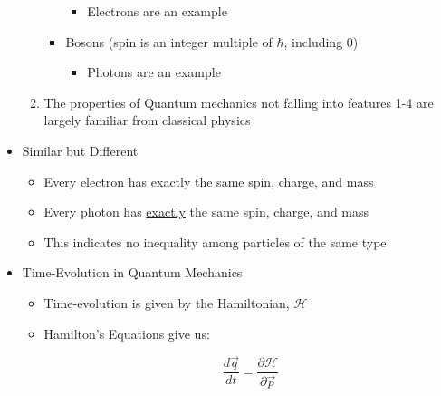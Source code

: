 \begin{itemize}
\begin{enumerate}
\begin{itemize}
            \begin{itemize}
                
              \item Electrons are an example

            \end{itemize}

          \item Bosons (spin is an integer multiple of $\hbar$, including 0)

            \begin{itemize}

              \item Photons are an example

            \end{itemize}

        \end{itemize}

      \item The properties of Quantum mechanics not falling into features 1-4 are largely familiar from classical physics

    \end{enumerate}

  \item Similar but Different

    \begin{itemize}

      \item Every electron has \underline{exactly} the same spin, charge, and mass

      \item Every photon has \underline{exactly} the same spin, charge, and mass

      \item This indicates no inequality among particles of the same type

    \end{itemize}

  \item Time-Evolution in Quantum Mechanics

    \begin{itemize}

      \item Time-evolution is given by the Hamiltonian, $\mathcal{H}$

      \item Hamilton's Equations give us:

        $$\frac{d\vec{q}}{dt}=\frac{\partial \mathcal{H}}{\partial \vec{p}}$$


\end{itemize}
\end{itemize}
